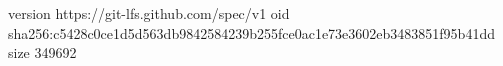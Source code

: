 version https://git-lfs.github.com/spec/v1
oid sha256:c5428c0ce1d5d563db9842584239b255fce0ac1e73e3602eb3483851f95b41dd
size 349692
